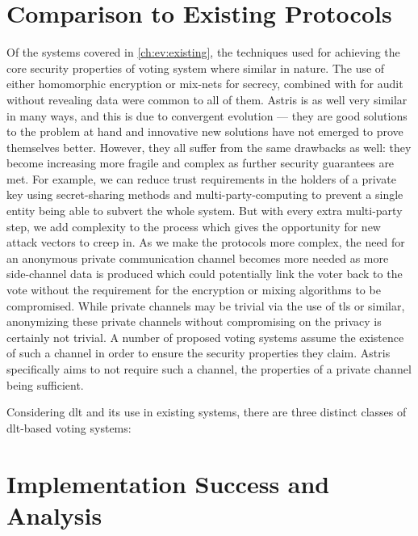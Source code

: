 \section{Comparison to Existing Protocols}
\label{ch:analysis:comparison}

Of the systems covered in \autoref{ch:ev:existing}, the techniques used for achieving the core security properties of voting system where similar in nature. The use of either homomorphic encryption or mix-nets for secrecy, combined with  for audit without revealing data were common to all of them. Astris is as well very similar in many ways, and this is due to convergent evolution --- they are good solutions to the problem at hand and innovative new solutions have not emerged to prove themselves better. However, they all suffer from the same drawbacks as well: they become increasing more fragile and  complex as further security guarantees are met. For example, we can reduce trust requirements in the holders of a private key using secret-sharing methods and multi-party-computing to prevent a single entity being able to subvert the whole system. But with every extra multi-party step, we add complexity to the process which gives the opportunity for new attack vectors to creep in. As we make the protocols more complex, the need for an anonymous private communication channel becomes more needed as more side-channel data is produced which could potentially link the voter back to the vote without the requirement for the encryption or mixing algorithms to be compromised. While private channels may be trivial via the use of \gls{tls} or similar, anonymizing these private channels without compromising on the privacy is certainly not trivial. A number of proposed voting systems  assume the existence of such a channel in order to ensure the security properties they claim. Astris specifically aims to not require such a channel, the properties of a private channel being sufficient.

Considering \gls{dlt} and its use in existing systems, there are three distinct classes of \gls{dlt}-based voting systems:






\section{Implementation Success and Analysis}
\label{ch:analysis:impl}

